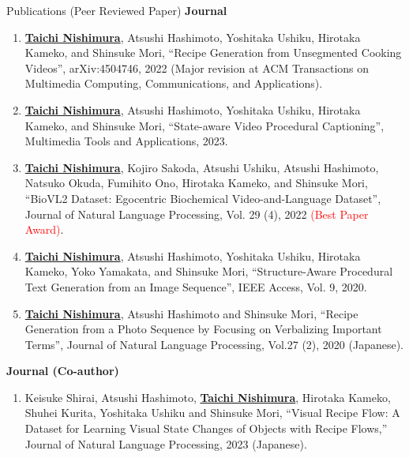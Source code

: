 \begin{rSection}{Publications (Peer Reviewed Paper)}
{\bf Journal}
\vspace{-0.15cm}
\begin{enumerate}
    \item \underline{{\bf Taichi Nishimura}}, Atsushi Hashimoto, Yoshitaka Ushiku, Hirotaka Kameko, and Shinsuke Mori, ``Recipe Generation from Unsegmented Cooking Videos'', arXiv:4504746, 2022 (Major revision at ACM Transactions on Multimedia Computing, Communications, and Applications).
    \item \underline{{\bf Taichi Nishimura}}, Atsushi Hashimoto, Yoshitaka Ushiku, Hirotaka Kameko, and Shinsuke Mori, ``State-aware Video Procedural Captioning'', Multimedia Tools and Applications, 2023.
    \item \underline{{\bf Taichi Nishimura}}, Kojiro Sakoda, Atsushi Ushiku, Atsushi Hashimoto, Natsuko Okuda, Fumihito Ono, Hirotaka Kameko, and Shinsuke Mori, ``BioVL2 Dataset: Egocentric Biochemical Video-and-Language Dataset'', Journal of Natural Language Processing, Vol. 29 (4), 2022 \textcolor{red}{(Best Paper Award)}.
    \item \underline{{\bf Taichi Nishimura}}, Atsushi Hashimoto, Yoshitaka Ushiku, Hirotaka Kameko, Yoko Yamakata, and Shinsuke Mori, ``Structure-Aware Procedural Text Generation from an Image Sequence'', IEEE Access, Vol. 9, 2020.
    \item \underline{{\bf Taichi Nishimura}}, Atsushi Hashimoto and Shinsuke Mori, ``Recipe Generation from a Photo Sequence by Focusing on Verbalizing Important Terms'', Journal of Natural Language Processing, Vol.27 (2), 2020 (Japanese).
\end{enumerate}

{\bf Journal (Co-author)}
\vspace{-0.15cm}
\begin{enumerate}
    \item Keisuke Shirai, Atsushi Hashimoto, \underline{{\bf Taichi Nishimura}}, Hirotaka Kameko, Shuhei Kurita, Yoshitaka Ushiku and Shinsuke Mori, ``Visual Recipe Flow: A Dataset for Learning Visual State Changes of Objects with Recipe Flows,'' Journal of Natural Language Processing, 2023 (Japanese).
\end{enumerate}


\end{rSection}
